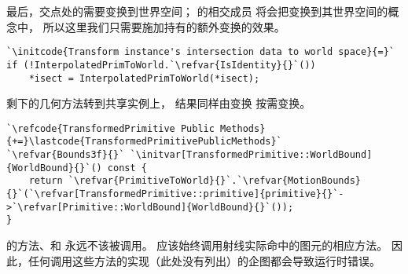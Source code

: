 最后，交点处的需要变换到世界空间；
的相交成员
将会把变换到其世界空间的概念中，
所以这里我们只需要施加持有的额外变换的效果。
\begin{lstlisting}
`\initcode{Transform instance's intersection data to world space}{=}`
if (!InterpolatedPrimToWorld.`\refvar{IsIdentity}{}`())
    *isect = InterpolatedPrimToWorld(*isect);
\end{lstlisting}

剩下的几何方法转到共享实例上，
结果同样由变换\linebreak
{}按需变换。
\begin{lstlisting}
`\refcode{TransformedPrimitive Public Methods}{+=}\lastcode{TransformedPrimitivePublicMethods}`
`\refvar{Bounds3f}{}` `\initvar[TransformedPrimitive::WorldBound]{WorldBound}{}`() const { 
    return `\refvar{PrimitiveToWorld}{}`.`\refvar{MotionBounds}{}`(`\refvar[TransformedPrimitive::primitive]{primitive}{}`->`\refvar[Primitive::WorldBound]{WorldBound}{}`());
}
\end{lstlisting}

的方法、和\linebreak
{}永远不该被调用。
应该始终调用射线实际命中的图元的相应方法。
因此，任何调用这些方法的实现（此处没有列出）的企图都会导致运行时错误。